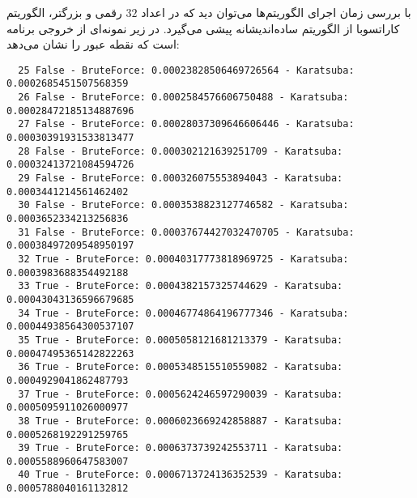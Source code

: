 \documentclass[]{article}
\begin{document}
با بررسی زمان اجرای الگوریتم‌ها می‌توان دید که در اعداد $32$ رقمی و بزرگتر،
الگوریتم کاراتسوبا از الگوریتم ساده‌اندیشانه پیشی می‌گیرد.
در زیر نمونه‌ای از خروجی برنامه است که نقطه عبور را نشان می‌دهد:
\begin{latin}
\begin{lstlisting}
  25 False - BruteForce: 0.00023828506469726564 - Karatsuba: 0.0002685451507568359
  26 False - BruteForce: 0.0002584576606750488 - Karatsuba: 0.00028472185134887696
  27 False - BruteForce: 0.00028037309646606446 - Karatsuba: 0.00030391931533813477
  28 False - BruteForce: 0.000302121639251709 - Karatsuba: 0.00032413721084594726
  29 False - BruteForce: 0.000326075553894043 - Karatsuba: 0.0003441214561462402
  30 False - BruteForce: 0.0003538823127746582 - Karatsuba: 0.0003652334213256836
  31 False - BruteForce: 0.00037674427032470705 - Karatsuba: 0.00038497209548950197
  32 True - BruteForce: 0.00040317773818969725 - Karatsuba: 0.0003983688354492188
  33 True - BruteForce: 0.0004382157325744629 - Karatsuba: 0.00043043136596679685
  34 True - BruteForce: 0.00046774864196777346 - Karatsuba: 0.00044938564300537107
  35 True - BruteForce: 0.0005058121681213379 - Karatsuba: 0.00047495365142822263
  36 True - BruteForce: 0.0005348515510559082 - Karatsuba: 0.0004929041862487793
  37 True - BruteForce: 0.0005624246597290039 - Karatsuba: 0.0005095911026000977
  38 True - BruteForce: 0.0006023669242858887 - Karatsuba: 0.0005268192291259765
  39 True - BruteForce: 0.0006373739242553711 - Karatsuba: 0.0005588960647583007
  40 True - BruteForce: 0.0006713724136352539 - Karatsuba: 0.0005788040161132812
\end{lstlisting}
\end{latin}
\end{document}
